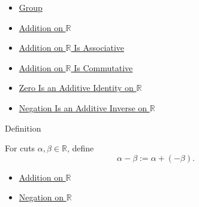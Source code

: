 \begin{dependencies}
\begin{itemize}
  \item \hyperref[def:group]{Group}
  \item \hyperref[def:addition-on-r]{Addition on $\mathbb{R}$}
  \item \hyperref[thm:addition-on-r-associative]{Addition on $\mathbb{R}$ Is Associative}
  \item \hyperref[thm:addition-on-r-commutative]{Addition on $\mathbb{R}$ Is Commutative}
  \item \hyperref[thm:zero-additive-identity-on-r]{Zero Is an Additive Identity on $\mathbb{R}$}
  \item \hyperref[thm:negation-additive-inverse-on-r]{Negation Is an Additive Inverse on $\mathbb{R}$}
\end{itemize}
\end{dependencies}

\begin{definitionbox}{Definition}
\begin{definition}
\label{def:subtraction-on-r}
For cuts $\alpha,\beta\in\mathbb{R}$, define
\[
\alpha-\beta:=\alpha+(-\beta).
\]
\end{definition}
\end{definitionbox}

\begin{dependencies}
\begin{itemize}
  \item \hyperref[def:addition-on-r]{Addition on $\mathbb{R}$}
  \item \hyperref[def:negation-on-r]{Negation on $\mathbb{R}$}
\end{itemize}
\end{dependencies}
